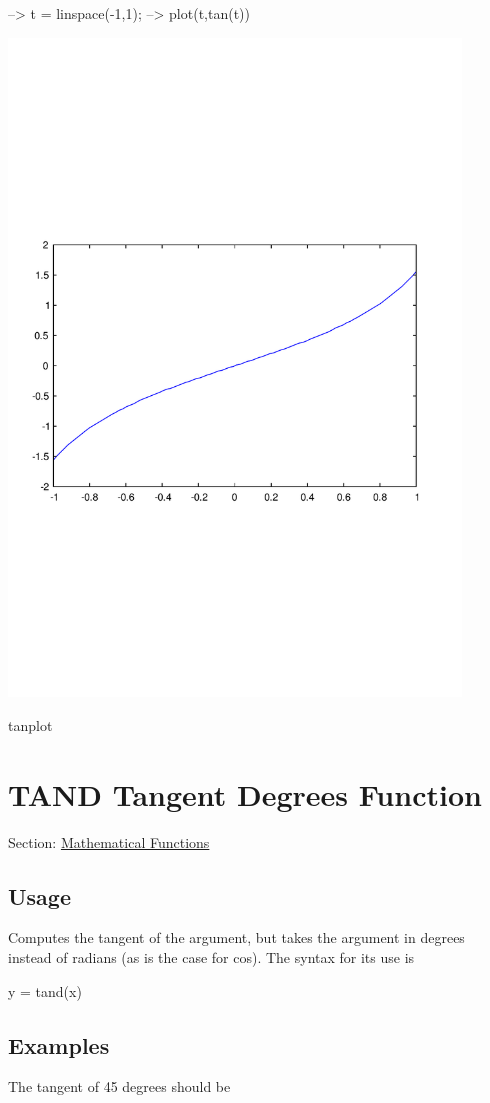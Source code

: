\begin{DoxyVerbInclude}
--> t = linspace(-1,1);
--> plot(t,tan(t))
\end{DoxyVerbInclude}


 
\begin{DoxyImage}
\includegraphics[width=12cm]{tanplot}
\caption{tanplot}
\end{DoxyImage}
 \hypertarget{mathfunctions_tand}{}\section{T\-A\-N\-D Tangent Degrees Function}\label{mathfunctions_tand}
Section\-: \hyperlink{sec_mathfunctions}{Mathematical Functions} \hypertarget{vtkwidgets_vtkxyplotwidget_Usage}{}\subsection{Usage}\label{vtkwidgets_vtkxyplotwidget_Usage}
Computes the tangent of the argument, but takes the argument in degrees instead of radians (as is the case for {\ttfamily cos}). The syntax for its use is \begin{DoxyVerb}   y = tand(x)
\end{DoxyVerb}
 \hypertarget{variables_matrix_Examples}{}\subsection{Examples}\label{variables_matrix_Examples}
The tangent of 45 degrees should be {}


